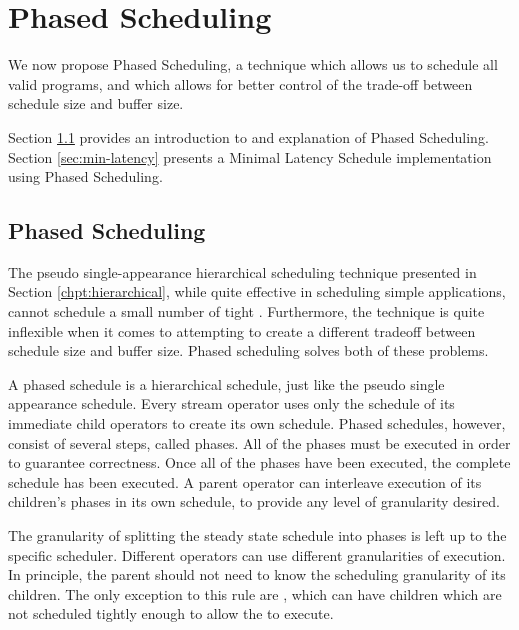 \section{Phased Scheduling}
\label{chpt:phased}

\begin{figure}[t]
\end{figure}

We now propose Phased Scheduling, a technique which allows us to
schedule all valid {\StreamIt} programs, and which allows for
better control of the trade-off between schedule size and buffer
size.

Section \ref{sec:phased:intro} provides an introduction to and
explanation of Phased Scheduling. Section \ref{sec:min-latency}
presents a Minimal Latency Schedule implementation using Phased
Scheduling.

\subsection{Phased Scheduling}
\label{sec:phased:intro}

The pseudo single-appearance hierarchical scheduling technique
presented in Section \ref{chpt:hierarchical}, while quite
effective in scheduling simple applications, cannot schedule a
small number of tight {\feedbackloops}. Furthermore, the
technique is quite inflexible when it comes to attempting to
create a different tradeoff between schedule size and buffer size.
Phased scheduling solves both of these problems.

A phased schedule is a hierarchical schedule, just like the pseudo
single appearance schedule. Every stream operator uses only the
schedule of its immediate child operators to create its own
schedule. Phased schedules, however, consist of several steps,
called phases. All of the phases must be executed in order to
guarantee correctness. Once all of the phases have been executed,
the complete schedule has been executed. A parent operator can
interleave execution of its children's phases in its own schedule,
to provide any level of granularity desired.

The granularity of splitting the steady state schedule into phases
is left up to the specific scheduler.  Different operators can use
different granularities of execution.  In principle, the parent
should not need to know the scheduling granularity of its
children. The only exception to this rule are {\feedbackloops},
which can have children which are not scheduled tightly enough to
allow the {\feedbackloop} to execute.

